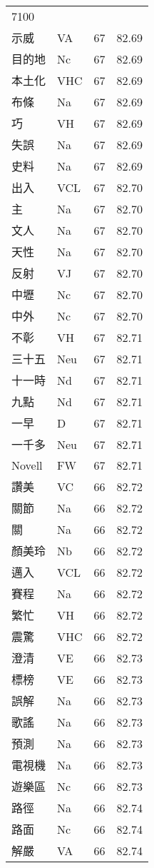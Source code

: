 \documentclass[twocolumn]{book}
\begin{document}
\begin{supertabular}{llrr}
7100\\
示威 & VA & 67 &  82.69\\
目的地 & Nc & 67 &  82.69\\
本土化 & VHC & 67 &  82.69\\
布條 & Na & 67 &  82.69\\
巧 & VH & 67 &  82.69\\
失誤 & Na & 67 &  82.69\\
史料 & Na & 67 &  82.69\\
出入 & VCL & 67 &  82.70\\
主 & Na & 67 &  82.70\\
文人 & Na & 67 &  82.70\\
天性 & Na & 67 &  82.70\\
反射 & VJ & 67 &  82.70\\
中壢 & Nc & 67 &  82.70\\
中外 & Nc & 67 &  82.70\\
不彰 & VH & 67 &  82.71\\
三十五 & Neu & 67 &  82.71\\
十一時 & Nd & 67 &  82.71\\
九點 & Nd & 67 &  82.71\\
一早 & D & 67 &  82.71\\
一千多 & Neu & 67 &  82.71\\
Novell & FW & 67 &  82.71\\
讚美 & VC & 66 &  82.72\\
關節 & Na & 66 &  82.72\\
關 & Na & 66 &  82.72\\
顏美玲 & Nb & 66 &  82.72\\
邁入 & VCL & 66 &  82.72\\
賽程 & Na & 66 &  82.72\\
繁忙 & VH & 66 &  82.72\\
震驚 & VHC & 66 &  82.72\\
澄清 & VE & 66 &  82.73\\
標榜 & VE & 66 &  82.73\\
誤解 & Na & 66 &  82.73\\
歌謠 & Na & 66 &  82.73\\
預測 & Na & 66 &  82.73\\
電視機 & Na & 66 &  82.73\\
遊樂區 & Nc & 66 &  82.73\\
路徑 & Na & 66 &  82.74\\
路面 & Nc & 66 &  82.74\\
解嚴 & VA & 66 &  82.74\\

\end{supertabular}
\end{document}
